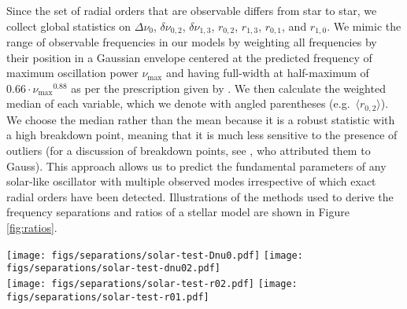 \documentclass[twocolumn,twocolappendix]{aastex6}
\begin{document}
Since the set of radial orders that are observable differs from star to star, we collect global statistics on $\Delta\nu_0$, $\delta\nu_{0,2}$, $\delta\nu_{1,3}$, $r_{0,2}$, $r_{1,3}$, $r_{0,1}$, and $r_{1,0}$. We mimic the range of observable frequencies in our models by weighting all frequencies by their position in a Gaussian envelope centered at the predicted frequency of maximum oscillation power $\nu_{\max}$ and having full-width at half-maximum of $0.66\cdot\nu_{\max}{}^{0.88}$ as per the prescription given by \citet{2012A&A...537A..30M}. We then calculate the weighted median of each variable, which we denote with angled parentheses (e.g.\ $\langle r_{0,2}\rangle$). We choose the median rather than the mean because it is a robust statistic with a high breakdown point, meaning that it is much less sensitive to the presence of outliers (for a discussion of breakdown points, see \citealt{hampel1971general}, who attributed them to Gauss). This approach allows us to predict the fundamental parameters of any solar-like oscillator with multiple observed modes irrespective of which exact radial orders have been detected. Illustrations of the methods used to derive the frequency separations and ratios of a stellar model are shown in Figure \ref{fig:ratios}. 

\begin{figure*}
    \centering
    \texttt{[image: figs/separations/solar-test-Dnu0.pdf]}\hfill
    \texttt{[image: figs/separations/solar-test-dnu02.pdf]}\\
    \texttt{[image: figs/separations/solar-test-r02.pdf]}\hfill
    \texttt{[image: figs/separations/solar-test-r01.pdf]}\\
    \caption{Calculation of seismic parameters for a stellar model. %
    The large and small frequency separations $\Delta\nu_0$ (top left) and $\delta\nu_{0,2}$ (top right) and frequency ratios $r_{0,2}$ (bottom left) and $r_{0,1}$ (bottom right) are shown as a function of frequency. The vertical dotted line in these bottom four plots indicates $\nu_{\max}$, and a $\nu_{\max}$-weighted linear fit is shown with a dashed diagonal line to guide the eye. Points are sized and colored proportionally to the applied weighting. }%
    \label{fig:ratios}
\end{figure*}
\end{document}
